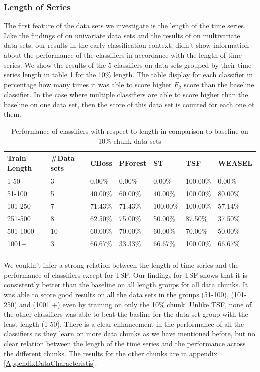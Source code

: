 \subsubsection{Length of Series}
The first feature of the data sets we investigate is the length of the time series.
Like the findings of \cite{bagnall2017great} on univariate data sets and the results of \cite{fawaz2019deepreview} on multivariate data sets,
our results in the early classification context, didn't show information about the performance of the classifiers in accordance with the length of time series.
We show the results of the 5 classifiers on data sets grouped by their time series length in table \ref{TableLength10} for the 10\% length.
The table display for each classifier in percentage how many times it was able to score higher $F_{\beta}$ score than the baseline classifier.
In the case where multiple classifiers are able to score higher than the baseline on one data set, then the score of this data set is counted for each one of them.

\begin{table}[hp!]
	\setlength\extrarowheight{2pt} %
	\begin{tabularx}{\textwidth}{|X|X|X|X|X|X|X|}
	\hline
	\textbf{Train Length} & \textbf{\#Data sets} & \textbf{CBoss} & \textbf{PForest} & \textbf{ST} & \textbf{TSF} & \textbf{WEASEL} \\ \hline
		1-50 & 3 & 0.00\% & 0.00\% & 0.00\% & 100.00\% & 0.00\% \\ \hline
		51-100 & 5 & 40.00\% & 60.00\% & 40.00\% & 100.00\% & 80.00\% \\ \hline
		101-250 & 7 & 71.43\% & 71.43\% & 100.00\% & 100.00\% & 57.14\% \\ \hline
		251-500 & 8 & 62.50\% & 75.00\% & 50.00\% & 87.50\% & 37.50\% \\ \hline
		501-1000 & 10 & 60.00\% & 70.00\% & 60.00\% & 70.00\% & 50.00\% \\ \hline
		1001+ & 3 & 66.67\% & 33.33\% & 66.67\% & 100.00\% & 66.67\% \\ \hline
	\caption{Performance of classifiers with respect to length in comparison to baseline on 10\% chunk data sets}
	\label{TableLength10}
  \end{tabularx}
\end{table}

We couldn't infer a strong relation between the length of time series and the performance of classifiers except for TSF. 
Our findings for TSF shows that it is consistently better than the baseline on all length groups for all data chunks.
It was able to score good results on all the data sets in the groups (51-100), (101-250) and (1001 +) even by training on only the 10\% chunk.
Unlike TSF, none of the other classifiers was able to beat the basline for the data set group with the least length (1-50).
There is a clear enhancement in the performance of all the classifiers as they learn on more data chunks as we have mentioned before,
but no clear relation between the length of the time series and the performance across the different chunks.
The results for the other chunks are in appendix \ref{AppendixDataCharacteristis}.

